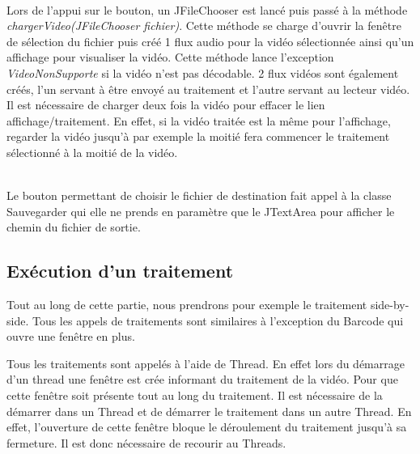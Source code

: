 \documentclass[10pt,a4paper]{article}
\begin{document}

~~\\

Lors de l'appui sur le bouton, un JFileChooser est lancé puis passé à la méthode \textit{chargerVideo(JFileChooser fichier)}.
Cette méthode se charge d'ouvrir la fenêtre de sélection du fichier puis créé 1 flux audio pour la vidéo sélectionnée ainsi qu'un affichage pour visualiser la vidéo. Cette méthode lance l'exception
\textit{VideoNonSupporte} si la vidéo n'est pas décodable.
2 flux vidéos sont également créés, l'un servant à être envoyé au traitement et l'autre servant au lecteur vidéo. Il est
nécessaire de charger deux fois la vidéo pour effacer le lien affichage/traitement. En effet, si la vidéo traitée est la même pour l'affichage, regarder la vidéo jusqu'à par exemple la moitié fera commencer
le traitement sélectionné à la moitié de la vidéo.


~~\\

Le bouton permettant de choisir le fichier de destination fait appel à la classe Sauvegarder qui elle ne prends en paramètre que le JTextArea pour afficher le chemin du fichier de sortie.

\subsection{Exécution d'un traitement}

Tout au long de cette partie, nous prendrons pour exemple le traitement side-by-side. Tous les appels de traitements sont similaires à l'exception du Barcode qui ouvre une fenêtre en plus.

Tous les traitements sont appelés à l'aide de Thread. En effet lors du démarrage d'un thread une fenêtre est crée informant du traitement de la vidéo. Pour que cette fenêtre soit présente
tout au long du traitement. Il est nécessaire de la démarrer dans un Thread et de démarrer le traitement dans un autre Thread. En effet, l'ouverture de cette fenêtre bloque le déroulement du traitement
jusqu'à sa fermeture. Il est donc nécessaire de recourir au Threads.
\end{document}
